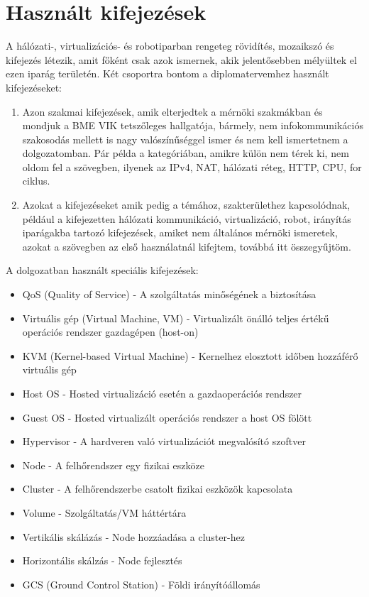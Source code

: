 \section{Használt kifejezések}
A hálózati-, virtualizációs- és robotiparban rengeteg rövidítés, mozaikszó és kifejezés létezik, amit főként csak azok ismernek, akik
jelentősebben mélyültek el ezen iparág területén. Két csoportra bontom a diplomatervemhez használt kifejezéseket:
\begin{enumerate}
	\item Azon szakmai kifejezések, amik elterjedtek a mérnöki szakmákban és mondjuk a BME VIK tetszőleges hallgatója, bármely, nem infokommunikációs szakosodás mellett is nagy valószínűséggel ismer és nem kell ismertetnem a dolgozatomban. Pár példa a kategóriában, amikre külön nem térek ki, nem oldom fel a szövegben, ilyenek az IPv4, NAT, hálózati réteg, HTTP, CPU, for ciklus.
	\item Azokat a kifejezéseket amik pedig a témához, szakterülethez kapcsolódnak, például a kifejezetten hálózati kommunikáció, virtualizáció, robot, irányítás iparágakba tartozó kifejezések, amiket nem általános mérnöki ismeretek, azokat a szövegben az első használatnál kifejtem, továbbá itt összegyűjtöm.
\end{enumerate}
A dolgozatban használt speciális kifejezések:
\begin{itemize}
	\item QoS (Quality of Service) - A szolgáltatás minőségének a biztosítása
	\item Virtuális gép (Virtual Machine, VM) - Virtualizált önálló teljes értékű operációs rendszer gazdagépen (host-on)
	\item KVM (Kernel-based Virtual Machine) - Kernelhez elosztott időben hozzáférő virtuális gép
	\item Host OS - Hosted virtualizáció esetén a gazdaoperációs rendszer
	\item Guest OS - Hosted virtualizált operációs rendszer a host OS fölött
	\item Hypervisor - A hardveren való virtualizációt megvalósító szoftver
	\item Node - A felhőrendszer egy fizikai eszköze
	\item Cluster - A felhőrendszerbe csatolt fizikai eszközök kapcsolata
	\item Volume - Szolgáltatás/VM háttértára
	\item Vertikális skálázás - Node hozzáadása a cluster-hez
	\item Horizontális skálzás - Node fejlesztés
	\item GCS (Ground Control Station) - Földi irányítóállomás
\end{itemize}